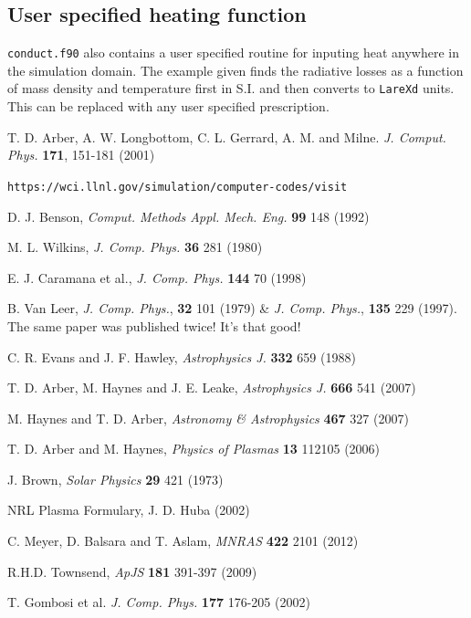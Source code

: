 \documentclass[11pt]{article}
\begin{document}
\subsection*{User specified heating function}
{\tt conduct.f90} also contains a user specified routine for inputing heat anywhere in the simulation domain. 
The example given finds the radiative losses as a function of mass density and temperature first in S.I. and 
then converts to {\tt LareXd} units. This can be replaced with any user specified prescription.


\newpage
\begin{thebibliography}{}

 T. D. Arber, A. W. Longbottom, C. L. Gerrard, A. M. and Milne. \textit{J. Comput. Phys.} \textbf{171}, 151-181 (2001)

 \texttt{https://wci.llnl.gov/simulation/computer-codes/visit}

 D. J. Benson, \textit{Comput. Methods Appl. Mech. Eng.} \textbf{99} 148 (1992)

 M. L. Wilkins, \textit{J. Comp. Phys.} \textbf{36} 281 (1980)

 E. J. Caramana et al., \textit{J. Comp. Phys.} \textbf{144} 70 (1998)

 B. Van Leer, \textit{J. Comp. Phys.}, \textbf{32} 101 (1979)  \& \textit{J. Comp. Phys.}, \textbf{135} 229 (1997). 
The same paper was published twice! It's that good!

 C. R. Evans and J. F. Hawley, \textit{Astrophysics J.} \textbf{332} 659 (1988)

 T. D. Arber, M. Haynes and J. E. Leake, {\it Astrophysics J.} \textbf{666} 541 (2007)

 M. Haynes and T. D. Arber, \textit{Astronomy \& Astrophysics } \textbf{467} 327 (2007)

 T. D. Arber and M. Haynes, \textit{Physics of Plasmas} \textbf{13} 112105 (2006)

 J. Brown, \textit{Solar Physics} \textbf{29} 421 (1973)

 NRL Plasma Formulary, J. D. Huba (2002)

 C. Meyer, D. Balsara and T. Aslam, \textit{MNRAS} \textbf{422} 2101 (2012)

 R.H.D. Townsend, \textit{ApJS} \textbf{181} 391-397 (2009)

 T. Gombosi et al. \textit{J. Comp. Phys.} \textbf{177} 176-205 (2002)

\end{thebibliography}
\end{document}
